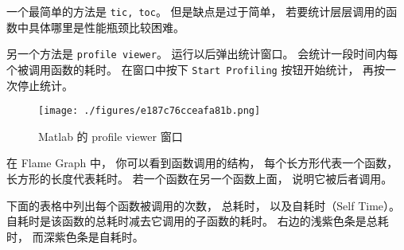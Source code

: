 
\begin{issues}
\issueDraft
\end{issues}


一个最简单的方法是 \verb|tic, toc|。 但是缺点是过于简单， 若要统计层层调用的函数中具体哪里是性能瓶颈比较困难。

另一个方法是 \verb|profile viewer|。 运行以后弹出统计窗口。 会统计一段时间内每个被调用函数的耗时。 在窗口中按下 \verb|Start Profiling| 按钮开始统计， 再按一次停止统计。

\begin{figure}[ht]
\centering
\texttt{[image: ./figures/e187c76cceafa81b.png]}
\caption{Matlab 的 profile viewer 窗口} \label{fig_MLprof_1}
\end{figure}

在 Flame Graph 中， 你可以看到函数调用的结构， 每个长方形代表一个函数， 长方形的长度代表耗时。 若一个函数在另一个函数上面， 说明它被后者调用。

下面的表格中列出每个函数被调用的次数， 总耗时， 以及自耗时（Self Time）。 自耗时是该函数的总耗时减去它调用的子函数的耗时。 右边的浅紫色条是总耗时， 而深紫色条是自耗时。
